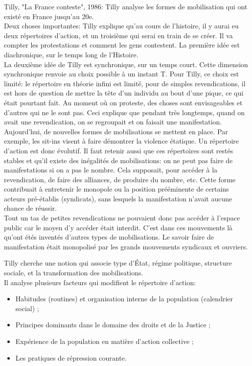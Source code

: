 \documentclass[10pt, a4paper, openany]{book}
\begin{document}
Tilly, "La France conteste", 1986: Tilly analyse les formes de mobilisation qui ont existé en France jusqu'au 20e. \\
Deux choses importantes: Tilly explique qu'au cours de l'histoire, il y aurai eu deux répertoires d'action, et un troisième qui serai en train de se créer. Il va compter les protestations et comment les gens contestent. La première idée est diachronique, sur le temps long de l'Histoire. \\
La deuxième idée de Tilly est synchronique, sur un temps court. Cette dimension synchronique renvoie au choix possible à un instant T. Pour Tilly, ce choix est limité: le répertoire en théorie infini est limité, pour de simples revendications, il est hors de question de mettre la tête d'un individu au bout d'une pique, ce qui était pourtant fait. Au moment où on proteste, des choses sont envisageables et d'autres qui ne le sont pas. Ceci explique que pendant très longtemps, quand on avait une revendication, on se regroupait et on faisait une manifestation. \\
Aujourd'hui, de nouvelles formes de mobilisations se mettent en place. Par exemple, les sit-ins visent à faire démontrer la violence étatique. Un répertoire d'action est donc évolutif. Il faut retenir aussi que ces répertoires sont restés stables et qu'il existe des inégalités de mobilisations: on ne peut pas faire de manifestations si on a pas le nombre. Cela supposait, pour accéder à la revendication, de faire des alliances, de produire du nombre, etc. Cette forme contribuait à entretenir le monopole ou la position prééminente de certains acteurs pré-établis (syndicats), sans lesquels la manifestation n'avait aucune chance de réussir. \\
Tout un tas de petites revendications ne pouvaient donc pas accéder à l'espace public car le moyen d'y accéder était interdit. C'est dans ces mouvements là qu'ont étés inventés d'autres types de mobilisations. Le savoir faire de manifestation était monopolisé par les grands mouvements syndicaux et ouvriers. 


Tilly cherche une notion qui associe type d'État, régime politique, structure sociale, et la transformation des mobilisations. \\
Il analyse plusieurs facteurs qui modifient le répertoire d'action: 
\begin{itemize}
\item Habitudes (routines) et organisation interne de la population (calendrier social) ;
\item Principes dominants dans le domaine des droits et de la Justice ;
\item Expérience de la population en matière d'action collective ;
\item Les pratiques de répression courante. 
\end{itemize}
\end{document}
